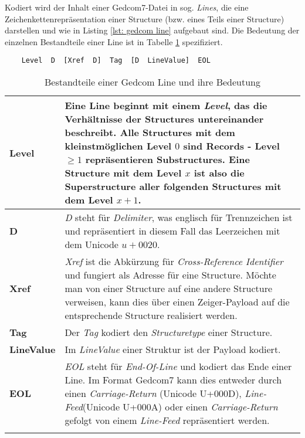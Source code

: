 {Kodiert wird der Inhalt einer Gedcom7-Datei in sog. \textit{Lines}, die eine Zeichenkettenrepräsentation einer Structure (bzw. eines Teils einer Structure) darstellen und wie in Listing \ref{lst: gedcom line} aufgebaut sind. Die Bedeutung der einzelnen Bestandteile einer Line ist in Tabelle \ref{tab: gedcom line} spezifiziert.
\vspace{1em}
\begin{lstlisting}
	Level  D  [Xref  D]  Tag  [D  LineValue]  EOL
\end{lstlisting}
\label{lst: gedcom line}
\newpage
\bgroup
\def\arraystretch{1.5}%
\setlength{\tabcolsep}{18pt}
\begin{longtable}{|p{2cm}|p{10cm}|}
	\hline
	\textbf{Level} & Eine Line beginnt mit einem \textit{Level}, das die Verhältnisse der Structures untereinander beschreibt. Alle Structures mit dem kleinstmöglichen Level $0$ sind Records - Level $\ge1$ repräsentieren Substructures. Eine Structure mit dem Level $x$ ist also die Superstructure aller folgenden Structures mit dem Level $x+1$. \\
	\hline
	\textbf{D} & \textit{D} steht für \textit{Delimiter}, was englisch für Trennzeichen ist und repräsentiert in diesem Fall das Leerzeichen mit dem Unicode $u+0020$. \\
	\hline
	\textbf{Xref} & \textit{Xref} ist die Abkürzung für \textit{Cross-Reference Identifier} und fungiert als Adresse für eine Structure. Möchte man von einer Structure auf eine andere Structure verweisen, kann dies über einen Zeiger-Payload auf die entsprechende Structure realisiert werden.\\
	\hline
	\textbf{Tag} & Der \textit{Tag} kodiert den \textit{Structuretype} einer Structure.\\
	\hline
	\textbf{LineValue} & Im \textit{LineValue} einer Struktur ist der Payload kodiert.\\
	\hline
	\textbf{EOL} & \textit{EOL} steht für \textit{End-Of-Line} und kodiert das Ende einer Line. Im Format Gedcom7 kann dies entweder durch einen \textit{Carriage-Return} (Unicode U+000D), \textit{Line-Feed}(Unicode U+000A) oder einen \textit{Carriage-Return} gefolgt von einem \textit{Line-Feed} repräsentiert werden.\\
	\hline
	\caption{Bestandteile einer Gedcom Line und ihre Bedeutung} %
	\label{tab: gedcom line}
\end{longtable}
}

